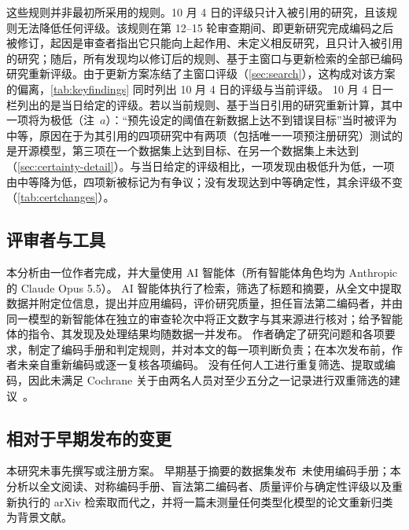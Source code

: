 这些规则并非最初所采用的规则。10 月 4 日的评级只计入被引用的研究，且该规则无法降低任何评级。该规则在第 12--15 轮审查期间、即更新研究完成编码之后被修订，起因是审查者指出它只能向上起作用、未定义相反研究，且只计入被引用的研究；随后，所有发现均以修订后的规则、基于主窗口与更新检索的全部已编码研究重新评级。由于更新方案冻结了主窗口评级（\cref{sec:search}），这构成对该方案的偏离，\cref{tab:keyfindings} 同时列出 10 月 4 日的评级与当前评级。
10 月 4 日一栏列出的是当日给定的评级。若以当前规则、基于当日引用的研究重新计算，其中一项将为极低（注~$a$）：“预先设定的阈值在新数据上达不到错误目标”当时被评为中等，原因在于为其引用的四项研究中有两项（包括唯一一项预注册研究）测试的是开源模型，第三项在一个数据集上达到目标、在另一个数据集上未达到（\cref{sec:certainty-detail}）。与当日给定的评级相比，一项发现由极低升为低，一项由中等降为低，四项新被标记为有争议；没有发现达到中等确定性，其余评级不变（\cref{tab:certchanges}）。

\subsection{评审者与工具}

本分析由一位作者完成，并大量使用 AI 智能体（所有智能体角色均为 Anthropic 的 Claude Opus 5.5）。
AI 智能体执行了检索，筛选了标题和摘要，从全文中提取数据并附定位信息，提出并应用编码，评价研究质量，担任盲法第二编码者，并由同一模型的新智能体在独立的审查轮次中将正文数字与其来源进行核对；给予智能体的指令、其发现及处理结果均随数据一并发布。
作者确定了研究问题和各项要求，制定了编码手册和判定规则，并对本文的每一项判断负责；在本次发布前，作者未亲自重新编码或逐一复核各项编码。
没有任何人工进行重复筛选、提取或编码，因此未满足 Cochrane 关于由两名人员对至少五分之一记录进行双重筛选的建议~\cite{garritty2021cochrane}。

\subsection{相对于早期发布的变更}

本研究未事先撰写或注册方案。
早期基于摘要的数据集发布~\cite{survey01}未使用编码手册；本分析以全文阅读、对称编码手册、盲法第二编码者、质量评价与确定性评级以及重新执行的 arXiv 检索取而代之，并将一篇未测量任何类型化模型的论文重新归类为背景文献。
